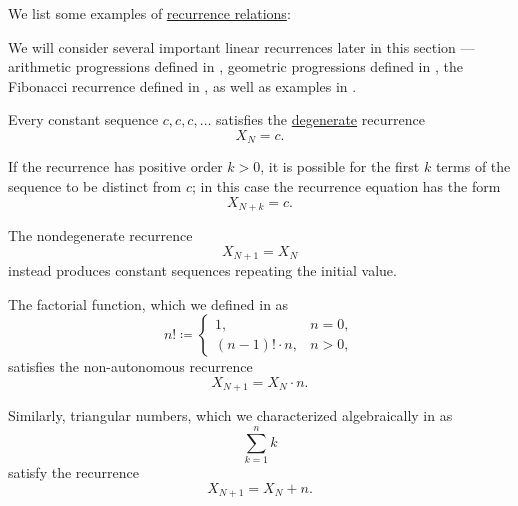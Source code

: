 \begin{example}\label{ex:def:recurrence_relation}
  We list some examples of \hyperref[def:recurrence_relation]{recurrence relations}:
  \begin{thmenum}
     We will consider several important linear recurrences later in this section --- arithmetic progressions defined in , geometric progressions defined in , the Fibonacci recurrence defined in , as well as examples in .

     Every constant sequence \( c, c, c, \ldots \) satisfies the \hyperref[def:recurrence_relation/degenerate]{degenerate} recurrence
    \begin{equation*}
      X_N = c.
    \end{equation*}

    If the recurrence has positive order \( k > 0 \), it is possible for the first \( k \) terms of the sequence to be distinct from \( c \); in this case the recurrence equation has the form
    \begin{equation*}
      X_{N+k} = c.
    \end{equation*}

    The nondegenerate recurrence
    \begin{equation*}
      X_{N+1} = X_N
    \end{equation*}
    instead produces constant sequences repeating the initial value.

     The factorial function, which we defined in  as
    \begin{equation*}
      n! \coloneqq \begin{cases}
        1,                &n = 0, \\
        (n - 1)! \cdot n, &n > 0,
      \end{cases}
    \end{equation*}
    satisfies the non-autonomous recurrence
    \begin{equation*}
      X_{N+1} = X_N \cdot n.
    \end{equation*}

     Similarly, triangular numbers, which we characterized algebraically in  as
    \begin{equation*}
      \sum_{k=1}^n k
    \end{equation*}
    satisfy the recurrence
    \begin{equation*}
      X_{N+1} = X_N + n.
    \end{equation*}


\end{thmenum}
\end{example}

